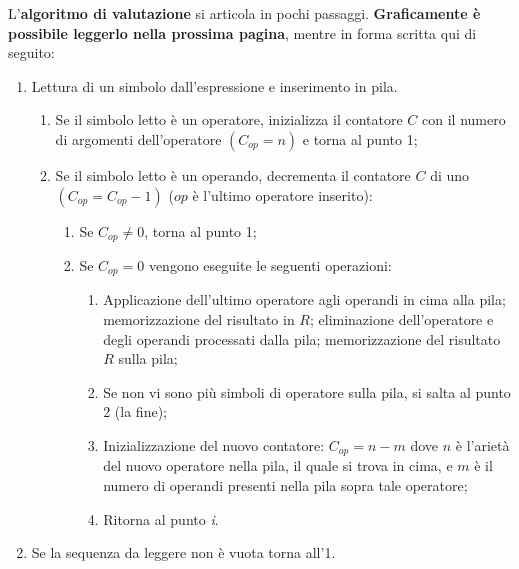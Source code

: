 \documentclass[a4paper]{article}
\begin{document}
	\noindent
	L'\textcolor{Red3}{\textbf{algoritmo di valutazione}} si articola in pochi passaggi. \textbf{Graficamente è possibile leggerlo nella prossima pagina}, mentre in forma scritta qui di seguito:
	\begin{enumerate}
		\item Lettura di un simbolo dall'espressione e inserimento in pila.
		
		\begin{enumerate}
			\item Se il simbolo letto è un operatore, inizializza il contatore $C$ con il numero di argomenti dell'operatore $\left(C_{op} = n\right)$ e torna al punto 1;
			
			\item Se il simbolo letto è un operando, decrementa il contatore $C$ di uno $\left(C_{op} = C_{op}-1\right)$ ($op$ è l'ultimo operatore inserito):
			
			\begin{enumerate}
				\item Se $C_{op} \ne 0$, torna al punto 1;
				
				\item Se $C_{op} = 0$ vengono eseguite le seguenti operazioni:
				
				\begin{enumerate}
					\item Applicazione dell'ultimo operatore agli operandi in cima alla pila;\newline
					memorizzazione del risultato in $R$;\newline
					eliminazione dell'operatore e degli operandi processati dalla pila;\newline
					memorizzazione del risultato $R$ sulla pila;
					
					\item Se non vi sono più simboli di operatore sulla pila, si salta al punto 2 (la fine);
					
					\item Inizializzazione del nuovo contatore: $C_{op} = n - m$ dove $n$ è l'arietà del nuovo operatore nella pila, il quale si trova in cima, e $m$ è il numero di operandi presenti nella pila sopra tale operatore;
					
					\item Ritorna al punto \emph{i}.
				\end{enumerate}
			\end{enumerate}
		\end{enumerate}
		
		\item Se la sequenza da leggere non è vuota torna all'1.
	\end{enumerate}\newpage
	
\end{document}
